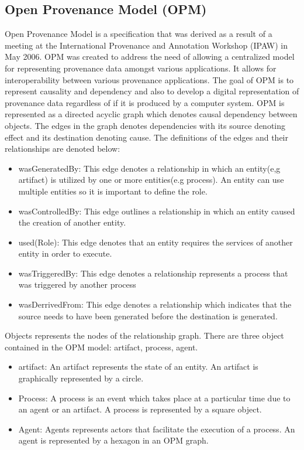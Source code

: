 \subsection{Open Provenance Model (OPM)}

Open Provenance Model \cite{moreau_open_2011} is a specification that was derived as a result of a meeting at the International Provenance and Annotation Workshop (IPAW) in May 2006. OPM was created to address the need of allowing a centralized model for representing provenance data amongst various applications. It allows for interoperability between various provenance applications. The goal of OPM is to represent causality and dependency and also to develop a digital representation of provenance data regardless of if it is produced by a computer system. OPM is represented as a directed acyclic graph which denotes causal dependency between objects. The edges in the graph denotes dependencies with its source denoting effect and its destination denoting cause. The definitions of the edges and their relationships are denoted below: 

\begin{itemize}
\item wasGeneratedBy: This edge denotes a  relationship in which an entity(e,g artifact) is utilized by one or  more entities(e.g process). An entity can use multiple entities so it is important to define the role.  
\item wasControlledBy: This edge outlines a relationship in which an entity caused the creation of another entity.
\item used(Role): This edge denotes that an entity requires the services of another entity in order to execute.
\item wasTriggeredBy: This edge denotes a relationship represents a process that was triggered by another process
\item wasDerrivedFrom: This edge denotes a relationship which indicates that the source needs to have been generated before the destination is generated.
\end{itemize}

 Objects represents the nodes of the relationship graph. There are three object contained in the OPM model: artifact, process, agent. 

\begin{itemize}
\item
artifact: An artifact represents the state of an entity. An artifact is graphically represented by a circle.

\item
Process: A process is an event which takes place at a particular time due to an agent or an artifact. A process is represented by a square object.

\item 
Agent: Agents represents actors that facilitate the execution of a process. An agent is represented by a hexagon in an OPM graph.
\end{itemize}

